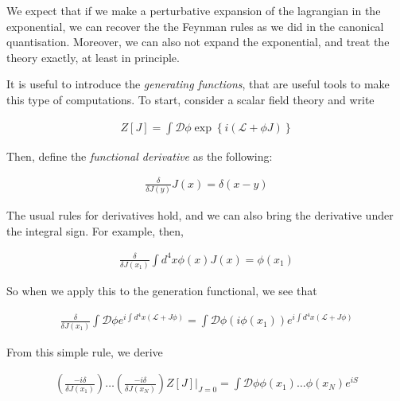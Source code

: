 \documentclass{report}
\begin{document}
We expect that if we make a perturbative expansion of the lagrangian in the exponential, we can recover the the Feynman rules as we did in the canonical quantisation. Moreover, we can also not expand the exponential, and treat the theory exactly, at least in principle. 

It is useful to introduce the \emph{generating functions}, that are useful tools to make this type of computations. To start, consider a scalar field theory and write

\begin{align}
    Z[J] = \int \mathcal{D}\phi \exp\left\{i(\mathcal{L} + \phi J )\right\}
\end{align}


Then, define the \emph{functional derivative} as the following: 

\begin{align}
    \frac{\delta}{\delta J(y)}J(x) = \delta(x-y)
\end{align}

The usual rules for derivatives hold, and we can also bring the derivative under the integral sign. For example, then, 

\begin{align}
    \frac{\delta}{\delta J(x_1)} \int d^4x \phi(x)J(x) = \phi(x_1)
\end{align}

So when we apply this to the generation functional, we see that 

\begin{align}
    \frac{\delta}{\delta J(x_1)}\int \mathcal{D}\phi e^{i\int d^4x (\mathcal{L} + J\phi)} = \int \mathcal{D}\phi (i\phi(x_1)) e^{i\int d^4x (\mathcal{L} + J\phi)}
\end{align}

From this simple rule, we derive 

\begin{align}
    \left(\frac{-i\delta}{\delta J(x_1)} \right)\ldots\left(\frac{-i\delta}{\delta J(x_N)} \right)Z[J]|_{J=0} = \int \mathcal{D}\phi \phi(x_1)\ldots \phi(x_N)e^{iS}
\end{align}
\end{document}
